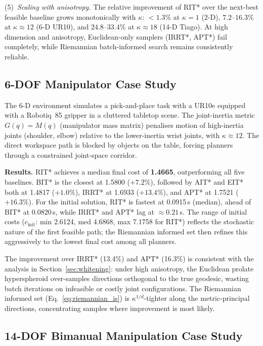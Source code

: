 \documentclass[journal]{IEEEtran}
\begin{document}
(5)~\emph{Scaling with anisotropy.}
The relative improvement of RIT* over the next-best feasible baseline
grows monotonically with $\kappa$:
$<1.3\%$ at $\kappa=1$ (2-D),
$7.2$--$16.3\%$ at $\kappa\approx12$ (6-D UR10),
and $24.8$--$33.4\%$ at $\kappa\approx18$ (14-D Tiago).
At high dimension and anisotropy, Euclidean-only samplers (IRRT*, APT*)
fail completely, while Riemannian batch-informed search remains
consistently reliable.


\subsection{6-DOF Manipulator Case Study}\label{sec:6dof}

The 6-D environment simulates a pick-and-place task with a UR10e
equipped with a Robotiq~85 gripper in a cluttered tabletop scene.
The joint-inertia metric $G(q) = M(q)$ (manipulator mass matrix)
penalises motion of high-inertia joints (shoulder, elbow) relative to
the lower-inertia wrist joints, with $\kappa \approx 12$.
The direct workspace path is blocked by objects on the table, forcing
planners through a constrained joint-space corridor.

\textbf{Results.}
RIT* achieves a median final cost of \textbf{1.4665}, outperforming
all five baselines. BIT* is the closest at 1.5800 ($+7.2\%$), followed
by AIT* and EIT* both at 1.4817 ($+1.0\%$), IRRT* at 1.6933
($+13.4\%$), and APT* at 1.7521 ($+16.3\%$).
For the initial solution, RIT* is fastest at 0.0915\,s (median), ahead
of BIT* at 0.0820\,s, while IRRT* and APT* lag at $\approx0.21$\,s.
The range of initial costs ($c_{\mathrm{init}}$: min 2.6124, med 4.6868,
max 7.1758 for RIT*) reflects the stochastic nature of the first
feasible path; the Riemannian informed set then refines this aggressively
to the lowest final cost among all planners.

The improvement over IRRT* (13.4\%) and APT* (16.3\%) is consistent
with the analysis in Section~\ref{sec:whitening}: under high anisotropy,
the Euclidean prolate hyperspheroid over-samples directions orthogonal
to the true geodesic, wasting batch iterations on infeasible or costly
joint configurations.
The Riemannian informed set (Eq.~\ref{eq:riemannian_is}) is
$\kappa^{1/d}$-tighter along the metric-principal directions,
concentrating samples where improvement is most likely.

\subsection{14-DOF Bimanual Manipulation Case Study}\label{sec:14dof}
\end{document}
